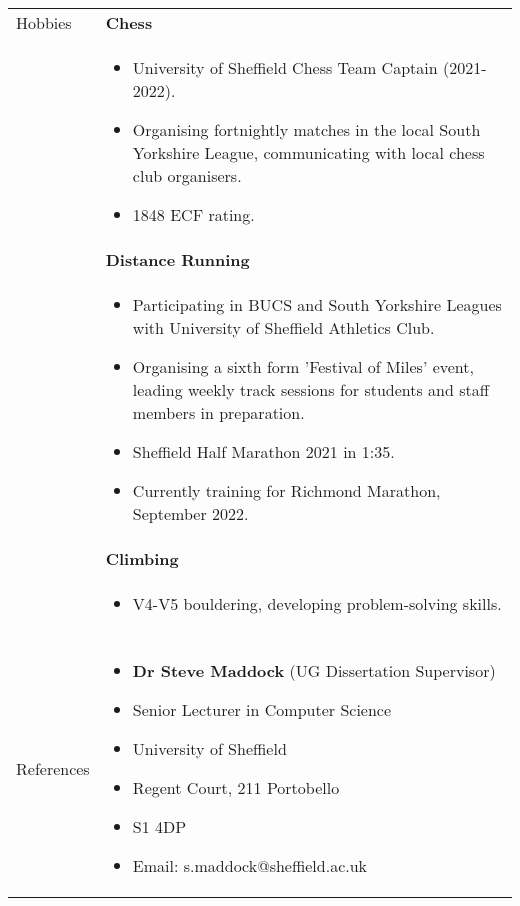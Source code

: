 \documentclass[11pt]{article}
\begin{document}
\begin{minipage}[t][0pt]{\linewidth}
\begin{tabular}[t]{p{2cm} p{14cm}}
		
	    {Hobbies} &
        \textbf{Chess} \\ &
		\begin{itemize}
			\renewcommand{\labelitemi}{$\diamond$}
			\item University of Sheffield Chess Team Captain (2021-2022). 
			\item Organising fortnightly matches in the local South Yorkshire League, communicating with local chess club organisers.
			\item 1848 ECF rating.
		\end{itemize} \\ &
		\textbf{Distance Running} \\ &
		\begin{itemize}
			\renewcommand{\labelitemi}{$\diamond$}
			\item Participating in BUCS and South Yorkshire Leagues with University of Sheffield Athletics Club.
			\item Organising a sixth form 'Festival of Miles' event, leading weekly track sessions for students and staff members in preparation.
			\item Sheffield Half Marathon 2021 in 1:35.
			\item Currently training for Richmond Marathon, September 2022.
		\end{itemize} \\ &
		\textbf{Climbing} \\ &
		\begin{itemize}
			\renewcommand{\labelitemi}{$\diamond$}
			\item V4-V5 bouldering, developing problem-solving skills.
		\end{itemize} \\ &
		\\

	{References} &
	    \begin{itemize}[label={}]
	        \item \textbf{Dr Steve Maddock} (UG Dissertation Supervisor)
        	\item Senior Lecturer in Computer Science
            \item University of Sheffield
            \item Regent Court, 211 Portobello
            \item S1 4DP
        	\item Email: s.maddock@sheffield.ac.uk 
	    \end{itemize}
    \end{tabular}
\end{minipage}
\end{document}

